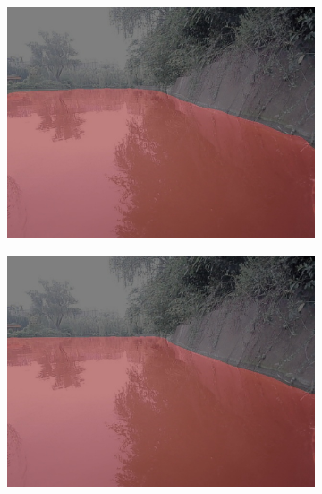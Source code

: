 \documentclass[cn,12pt,color=mine,scheme=chinese,bibstyle=gb7714-2015]{elegantbook}
\begin{document}
\begin{figure}[h]
\begin{subfigure}[b]{0.23\linewidth}
		\centering\includegraphics[width=\linewidth]{results2/test4setr}
	\end{subfigure}
	\begin{subfigure}[b]{0.23\linewidth}
		\centering\includegraphics[width=\linewidth]{results2/test4segformer}
	\end{subfigure}\\
	\vspace{1mm}
	\begin{subfigure}[b]{0.23\linewidth}

\end{subfigure}
\end{figure}
\end{document}
